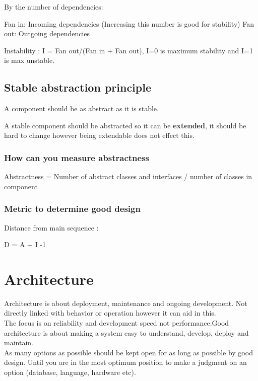 \documentclass[11pt]{scrartcl} %
\begin{document}
By the number of dependencies:

Fan in: Incoming dependencies (Increasing this number is good for
stability) Fan out: Outgoing dependencies

Instability : I = Fan out/(Fan in + Fan out), I=0 is maximum stability
and I=1 is max unstable.

\subsection{Stable abstraction principle}

A component should be as abstract as it is stable.

A stable component should be abstracted so it can be \textbf{extended},
it should be hard to change however being extendable does not effect
this.

\subsubsection{How can you measure abstractness}

Abstractness = Number of abstract classes and interfaces / number of
classes in component


\subsubsection{Metric to determine good design}

Distance from main sequence :

D = \textbar{} A + I -1 \textbar{}

\section{Architecture}

Architecture is about deployment, maintenance and ongoing development.
Not directly linked with behavior or operation however it can aid in
this.\\

The focus is on reliability and development speed not performance.Good architecture is about
making a system easy to understand, develop, deploy and maintain.\\

As many options as possible should be kept open for as long as possible
by good design. Until you are in the most optimum position to make a
judgment on an option (database, language, hardware etc).\\
\end{document}
